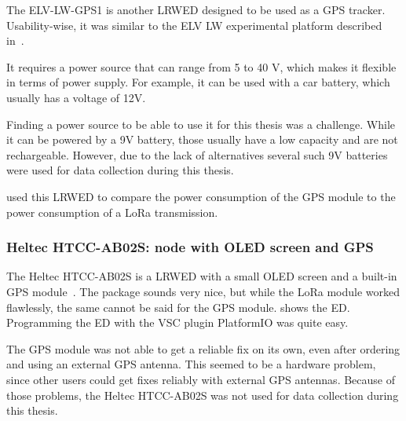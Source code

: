 The ELV-LW-GPS1 is another \acl{LRWED} designed to be used as a \ac{GPS} tracker.
Usability-wise, it was similar to the ELV LW experimental platform described in~.

It requires a power source that can range from 5 to 40 V, which makes it flexible in terms of power supply.
For example, it can be used with a car battery, which usually has a voltage of 12V.

Finding a power source to be able to use it for this thesis was a challenge.
While it can be powered by a 9V battery, those usually have a low capacity and are not rechargeable.
However, due to the lack of alternatives several such 9V batteries were used for data collection during this thesis.

 used this \acl{LRWED} to compare the power consumption of the \ac{GPS} module to the power consumption of a \ac{LoRa} transmission.

\subsubsection{Heltec HTCC-AB02S: node with \acs{OLED} screen and \acs{GPS}}\label{subsubsec:heltec-htcc-ab02s}

The Heltec HTCC-AB02S is a \acl{LRWED} with a small OLED screen and a built-in \ac{GPS} module~\cite{heltec_automation_cubecell_2020}.
The package sounds very nice, but while the \ac{LoRa} module worked flawlessly, the same cannot be said for the \ac{GPS} module.
 shows the \acl{ED}.
Programming the \acl{ED} with the \ac{VSC} plugin PlatformIO was quite easy.

The \ac{GPS} module was not able to get a reliable fix on its own, even after ordering and using an external \ac{GPS} antenna.
This seemed to be a hardware problem, since other users could get fixes reliably with external \ac{GPS} antennas.
Because of those problems, the Heltec HTCC-AB02S was not used for data collection during this thesis.

